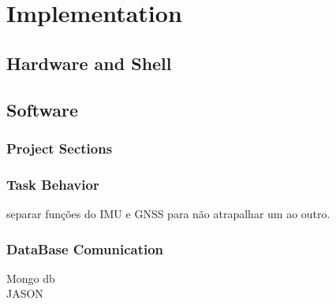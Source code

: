 \chapter{Implementation}
\section{Hardware and Shell}

\section{Software}

\subsection{Project Sections}

\subsection{Task Behavior}

separar funções do IMU e GNSS para não atrapalhar um ao outro.
\subsection{DataBase Comunication}
Mongo db \\
JASON